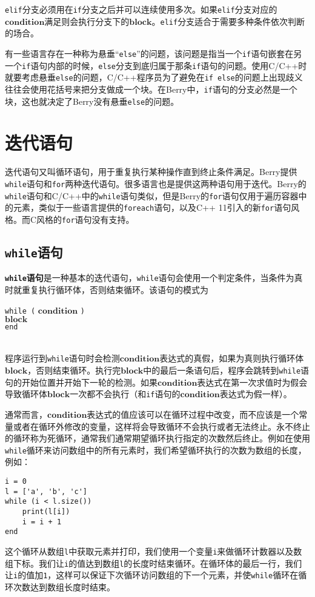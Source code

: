 \texttt{elif}分支必须用在\texttt{if}分支之后并可以连续使用多次。如果\texttt{elif}分支对应的$\bm{condition}$满足则会执行分支下的$\bm{block}$。\texttt{elif}分支适合于需要多种条件依次判断的场合。

有一些语言存在一种称为悬垂``\texttt{else}''的问题，该问题是指当一个\texttt{if}语句嵌套在另一个\texttt{if}语句内部的时候，\texttt{else}分支到底归属于那条\texttt{if}语句的问题。使用C/C++时就要考虑悬垂\texttt{else}的问题，C/C++程序员为了避免在\texttt{if else}的问题上出现歧义往往会使用花括号来把分支做成一个块。在Berry中，\texttt{if}语句的分支必然是一个块，这也就决定了Berry没有悬垂\texttt{else}的问题。

\section{迭代语句}

迭代语句又叫循环语句，用于重复执行某种操作直到终止条件满足。Berry提供\texttt{while}语句和\texttt{for}两种迭代语句。很多语言也是提供这两种语句用于迭代。Berry的\texttt{while}语句和C/C++中的\texttt{while}语句类似，但是Berry的\texttt{for}语句仅用于遍历容器中的元素，类似于一些语言提供的\texttt{foreach}语句，以及C++ 11引入的新\texttt{for}语句风格。而C风格的\texttt{for}语句没有支持。

\subsection{\texttt{while}语句}

\textbf{\texttt{while}语句}是一种基本的迭代语句，\texttt{while}语句会使用一个判定条件，当条件为真时就重复执行循环体，否则结束循环。该语句的模式为
\begin{algorithm}
    \texttt{while (} $\bm{condition}$ \texttt{)} \\
        \qquad $\bm{block}$ \\
    \texttt{end}
\end{algorithm}\vspace{-0.6em}\\
程序运行到\texttt{while}语句时会检测$\bm{condition}$表达式的真假，如果为真则执行循环体$\bm{block}$，否则结束循环。执行完$\bm{block}$中的最后一条语句后，程序会跳转到\texttt{while}语句的开始位置并开始下一轮的检测。如果$\bm{condition}$表达式在第一次求值时为假会导致循环体$\bm{block}$一次都不会执行（和\texttt{if}语句的$\bm{condition}$表达式为假一样）。

通常而言，$\bm{condition}$表达式的值应该可以在循环过程中改变，而不应该是一个常量或者在循环外修改的变量，这样将会导致循环不会执行或者无法终止。永不终止的循环称为死循环，通常我们通常期望循环执行指定的次数然后终止。例如在使用\texttt{while}循环来访问数组中的所有元素时，我们希望循环执行的次数为数组的长度，例如：
\begin{lstlisting}[language=berry, numbers=none]
i = 0
l = ['a', 'b', 'c']
while (i < l.size())
    print(l[i])
    i = i + 1
end
\end{lstlisting}
这个循环从数组\texttt{l}中获取元素并打印，我们使用一个变量\texttt{i}来做循环计数器以及数组下标。我们让\texttt{i}的值达到数组\texttt{l}的长度时结束循环。在循环体的最后一行，我们让\texttt{i}的值加\texttt{1}，这样可以保证下次循环访问数组的下一个元素，并使\texttt{while}循环在循环次数达到数组长度时结束。

